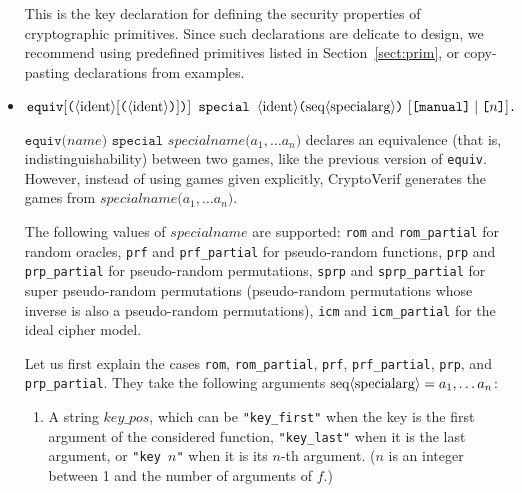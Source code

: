 \begin{itemize}
\begin{itemize}
\end{itemize}


\fi


This is the key declaration for defining the security properties of
cryptographic primitives. Since such declarations are delicate to
design, we recommend using predefined primitives listed in
Section~\ref{sect:prim}, or copy-pasting declarations from examples.

\item $\texttt{equiv}[\texttt{(}\nonterm{ident}[\texttt{(}\nonterm{ident}\texttt{)}]\texttt{)}]\texttt{ special }\nonterm{ident}\texttt{(}\seq{specialarg}\texttt{)}\ [\texttt{[manual]} \mid \texttt{[}n\texttt{]}]\texttt{.}$

  $\texttt{equiv(}\mathit{name}\texttt{) special
  }\mathit{specialname}\texttt{(}a_1, \dots a_n\texttt{)}$
  declares an equivalence (that is, indistinguishability) between two
  games, like the previous version of \texttt{equiv}. However, instead
  of using games given explicitly, CryptoVerif generates the games
  from $\mathit{specialname}\texttt{(}a_1, \dots a_n\texttt{)}$.

  The following values of $\mathit{specialname}$ are supported:
  \texttt{rom} and \texttt{rom\_partial} for random oracles,
  \texttt{prf} and \texttt{prf\_partial} for pseudo-random functions, 
  \texttt{prp} and \texttt{prp\_partial} for pseudo-random permutations,
  \texttt{sprp} and \texttt{sprp\_partial} for super pseudo-random permutations (pseudo-random permutations whose inverse is also a pseudo-random permutations),
  \texttt{icm} and \texttt{icm\_partial} for the ideal cipher model.

  Let us first explain the cases
  \texttt{rom}, \texttt{rom\_partial},
  \texttt{prf}, \texttt{prf\_partial}, 
  \texttt{prp}, and \texttt{prp\_partial}.
  They take the following arguments $\textrm{seq}\langle\textrm{specialarg}\rangle = a_1, \dots a_n$:
  \begin{enumerate}

\item A string $\mathit{key\_pos}$, which can be \texttt{"key\_first"}
when the key is the first argument of the considered function,
\texttt{"key\_last"} when it is the last argument, or
\texttt{"key $n$"} when it is its $n$-th argument. ($n$ is an integer
between 1 and the number of arguments of $f$.)


\end{enumerate}
\end{itemize}
